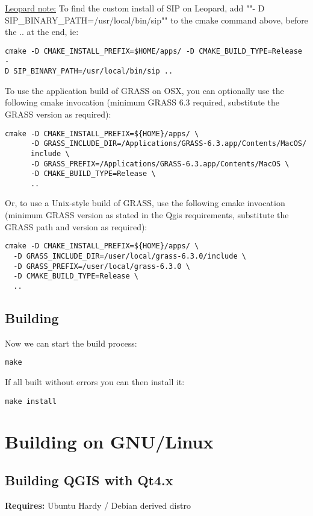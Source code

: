 \underline{Leopard note:} To find the custom install of SIP on Leopard, add ""-
D SIP\_BINARY\_PATH=/usr/local/bin/sip"" to the cmake command above,
before the .. at the end, ie:

\begin{verbatim}
cmake -D CMAKE_INSTALL_PREFIX=$HOME/apps/ -D CMAKE_BUILD_TYPE=Release -
D SIP_BINARY_PATH=/usr/local/bin/sip ..
\end{verbatim}

To use the application build of GRASS on OSX, you can optionally use the
following cmake invocation (minimum GRASS 6.3 required, substitute the GRASS
version as required):

\begin{verbatim}
cmake -D CMAKE_INSTALL_PREFIX=${HOME}/apps/ \
      -D GRASS_INCLUDE_DIR=/Applications/GRASS-6.3.app/Contents/MacOS/
      include \
      -D GRASS_PREFIX=/Applications/GRASS-6.3.app/Contents/MacOS \
      -D CMAKE_BUILD_TYPE=Release \
      ..
\end{verbatim}

Or, to use a Unix-style build of GRASS, use the following cmake invocation
(minimum GRASS version as stated in the Qgis requirements, substitute the GRASS
path and version as required):

\begin{verbatim}
cmake -D CMAKE_INSTALL_PREFIX=${HOME}/apps/ \
  -D GRASS_INCLUDE_DIR=/user/local/grass-6.3.0/include \
  -D GRASS_PREFIX=/user/local/grass-6.3.0 \
  -D CMAKE_BUILD_TYPE=Release \
  ..
\end{verbatim}

\subsection{Building}
Now we can start the build process:

\begin{verbatim}
make 
\end{verbatim}

If all built without errors you can then install it:

\begin{verbatim}
make install 
\end{verbatim}

\section{Building on GNU/Linux}
\subsection{Building QGIS with Qt4.x}
\textbf{Requires:} Ubuntu Hardy / Debian derived distro

